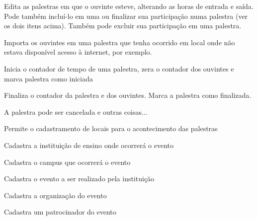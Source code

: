 \documentclass[12pt,a4paper]{article}
\begin{document}
				{Edita as palestras em que o ouvinte esteve, alterando as horas de entrada e saída. Pode também incluí-lo em uma ou finalizar sua participação numa palestra (ver os dois itens acima). Também pode excluir sua participação em uma palestra.}
				{%
				
				}
							
				
				{Importa os ouvintes em uma palestra que tenha ocorrido em local onde não estava disponível acesso à internet, por exemplo.}
				{%
				
				}
				
				{Inicia o contador de tempo de uma palestra, zera o contador dos ouvintes e marca palestra como iniciada}
				{%
				
				}
				
				{Finaliza o contador da palestra e dos ouvintes. Marca a palestra como finalizada.}
				{%
				
				}
				
				{A palestra pode ser cancelada e outras coisas...}
				{%
				
				}
				
				{Permite o cadastramento de locais para o acontecimento das palestras}
				{%
				
				}
				
				{Cadastra a instituição de ensino onde ocorrerá o evento}
				{%
				
				}
						
				
				{Cadastra o campus que ocorrerá o evento}
				{%
				
				}
				
				{Cadastra o evento a ser realizado pela instituição }
				{%
				
				}
				
				{Cadastra a organização do evento}
				{%
				
				}
				
				{Cadastra um patrocinador do evento}
				{%
				
				}
				
\end{document}

